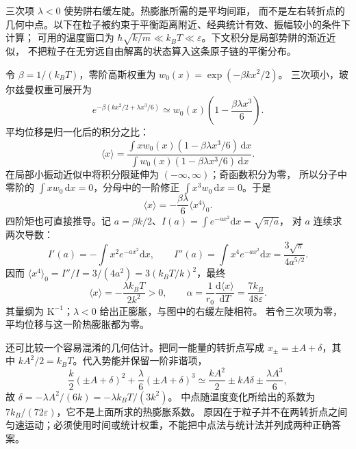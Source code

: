 {\begin{xesolution}
\par\Needspace{.70\textheight}
三次项 $\lambda<0$ 使势阱右缓左陡。热膨胀所需的是平均间距，
而不是左右转折点的几何中点。以下在粒子被约束于平衡距离附近、经典统计有效、振幅较小的条件下计算；
可用的温度窗口为 $\hbar\sqrt{k/m}\ll k_BT\ll\varepsilon$。下文积分是局部势阱的渐近近似，
不把粒子在无穷远自由解离的状态算入这条原子链的平衡分布。

令 $\beta=1/(k_BT)$，零阶高斯权重为 $w_0(x)=\exp(-\beta kx^2/2)$。
三次项小，玻尔兹曼权重可展开为
\[
 e^{-\beta(kx^2/2+\lambda x^3/6)}
 \simeq w_0(x)\left(1-\frac{\beta\lambda x^3}{6}\right).
\]
平均位移是归一化后的积分之比：
\[
 \langle x\rangle=
 \frac{\int xw_0(x)(1-\beta\lambda x^3/6)\,\mathrm dx}
 {\int w_0(x)(1-\beta\lambda x^3/6)\,\mathrm dx}.
\]
在局部小振动近似中将积分限延伸为 $(-\infty,\infty)$；奇函数积分为零，
所以分子中零阶的 $\int xw_0\,\mathrm dx=0$，分母中的一阶修正
$\int x^3w_0\,\mathrm dx=0$。于是
\[
 \langle x\rangle=-\frac{\beta\lambda}{6}\langle x^4\rangle_0.
\]
四阶矩也可直接推导。记 $a=\beta k/2$、$I(a)=\int e^{-ax^2}\mathrm dx=\sqrt{\pi/a}$，
对 $a$ 连续求两次导数：
\[
 I'(a)=-\int x^2e^{-ax^2}\mathrm dx,\qquad
 I''(a)=\int x^4e^{-ax^2}\mathrm dx=\frac{3\sqrt\pi}{4a^{5/2}}.
\]
因而 $\langle x^4\rangle_0=I''/I=3/(4a^2)=3(k_BT/k)^2$，最终
\[
 \langle x\rangle=-\frac{\lambda k_BT}{2k^2}>0,\qquad
 \boxed{\alpha=\frac1{r_0}\frac{\mathrm d\langle x\rangle}{\mathrm dT}
 =\frac{7k_B}{48\varepsilon}}.
\]
其量纲为 $\mathrm K^{-1}$；$\lambda<0$ 给出正膨胀，与图中的右缓左陡相符。
若令三次项为零，平均位移与这一阶热膨胀都为零。

还可比较一个容易混淆的几何估计。把同一能量的转折点写成
$x_\pm=\pm A+\delta$，其中 $kA^2/2=k_BT$。代入势能并保留一阶非谐项，
\[
 \frac{k}{2}(\pm A+\delta)^2+\frac{\lambda}{6}(\pm A+\delta)^3
 \simeq\frac{kA^2}{2}\pm kA\delta\pm\frac{\lambda A^3}{6},
\]
故 $\delta=-\lambda A^2/(6k)=-\lambda k_BT/(3k^2)$。
中点随温度变化所给出的系数为 $7k_B/(72\varepsilon)$，它不是上面所求的热膨胀系数。
原因在于粒子并不在两转折点之间匀速运动；必须使用时间或统计权重，不能把中点法与统计法并列成两种正确答案。
\end{xesolution}
}

\endgroup

\hypersetup{bookmarksdepth=2}
